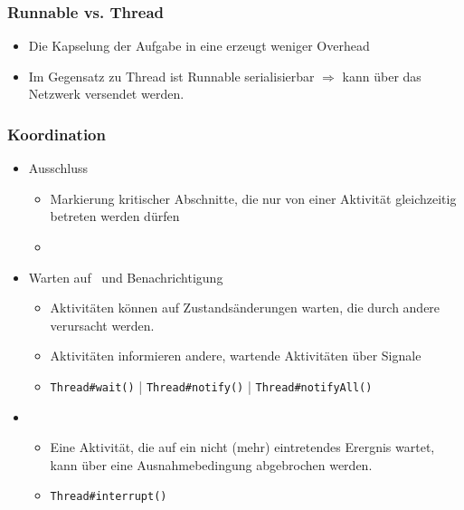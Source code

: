 \subsubsection{Runnable vs. Thread}
\begin{itemize}
    \item Die Kapselung der Aufgabe in eine  erzeugt weniger Overhead
    \item Im Gegensatz zu Thread ist Runnable serialisierbar $\Rightarrow$ kann über das Netzwerk versendet werden.
\end{itemize}

\subsubsection{Koordination}
\begin{itemize}
    \item {} Ausschluss
    \begin{itemize}
        \item Markierung kritischer Abschnitte, die nur von einer Aktivität gleichzeitig betreten werden dürfen
        \item {}
    \end{itemize}
    \item Warten auf \glqq{}\grqq\ und Benachrichtigung
    \begin{itemize}
        \item Aktivitäten können auf Zustandsänderungen warten, die durch andere verursacht werden.
        \item Aktivitäten informieren andere, wartende Aktivitäten über Signale
        \item \texttt{Thread\#wait()} | \texttt{Thread\#notify()} | \texttt{Thread\#notifyAll()}
    \end{itemize}
    \item {}
    \begin{itemize}
        \item Eine Aktivität, die auf ein nicht (mehr) eintretendes Erergnis wartet, kann über eine Ausnahmebedingung abgebrochen werden.
        \item \texttt{Thread\#interrupt()}
    \end{itemize}
\end{itemize}

